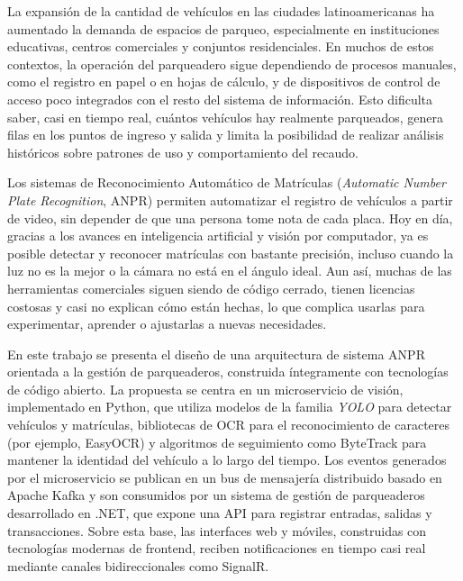 La expansión de la cantidad de vehículos en las ciudades latinoamericanas ha aumentado la demanda de espacios de parqueo, especialmente en instituciones educativas, centros comerciales y conjuntos residenciales. En muchos de estos contextos, la operación del parqueadero sigue dependiendo de procesos manuales, como el registro en papel o en hojas de cálculo, y de dispositivos de control de acceso poco integrados con el resto del sistema de información. Esto dificulta saber, casi en tiempo real, cuántos vehículos hay realmente parqueados, genera filas en los puntos de ingreso y salida y limita la posibilidad de realizar análisis históricos sobre patrones de uso y comportamiento del recaudo.

Los sistemas de Reconocimiento Automático de Matrículas (\textit{Automatic Number Plate Recognition}, ANPR) permiten automatizar el registro de vehículos a partir de video, sin depender de que una persona tome nota de cada placa. Hoy en día, gracias a los avances en inteligencia artificial y visión por computador, ya es posible detectar y reconocer matrículas con bastante precisión, incluso cuando la luz no es la mejor o la cámara no está en el ángulo ideal. Aun así, muchas de las herramientas comerciales siguen siendo de código cerrado, tienen licencias costosas y casi no explican cómo están hechas, lo que complica usarlas para experimentar, aprender o ajustarlas a nuevas necesidades.

En este trabajo se presenta el diseño de una arquitectura de sistema ANPR orientada a la gestión de parqueaderos, construida íntegramente con tecnologías de código abierto. La propuesta se centra en un microservicio de visión, implementado en Python, que utiliza modelos de la familia \textit{YOLO} para detectar vehículos y matrículas, bibliotecas de OCR para el reconocimiento de caracteres (por ejemplo, EasyOCR) y algoritmos de seguimiento como ByteTrack para mantener la identidad del vehículo a lo largo del tiempo. Los eventos generados por el microservicio se publican en un bus de mensajería distribuido basado en Apache Kafka y son consumidos por un sistema de gestión de parqueaderos desarrollado en .NET, que expone una API para registrar entradas, salidas y transacciones. Sobre esta base, las interfaces web y móviles, construidas con tecnologías modernas de frontend, reciben notificaciones en tiempo casi real mediante canales bidireccionales como SignalR.

